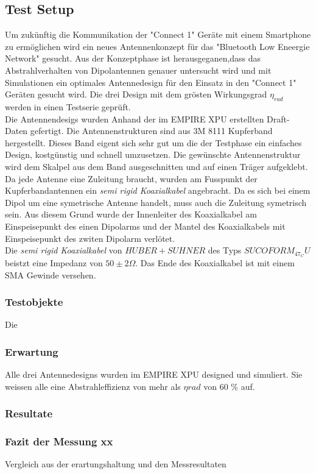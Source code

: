 \subsection{Test Setup}
Um zukünftig die Kommunikation der "Connect 1" Geräte mit einem Smartphone zu ermöglichen wird ein neues Antennenkonzept für das "Bluetooth Low Eneergie Network" gesucht. Aus der Konzeptphase ist herausgeganen,dass das Abstrahlverhalten von Dipolantennen genauer untersucht wird und mit Simulationen ein optimales Antennedesign für den Einsatz in den "Connect 1" Geräten gesucht wird. Die drei Design mit dem grösten Wirkungsgrad $\eta_{rad}$ werden in einen Testserie geprüft.\\
Die Antennendesigs wurden Anhand der im EMPIRE XPU erstellten Draft-Daten gefertigt. Die Antennenstrukturen sind aus 3M 8111 Kupferband hergestellt. Dieses Band eigent sich sehr gut um die der Testphase ein einfaches Design, kostgünstig und schnell umzusetzen. Die gewünschte Antennenstruktur wird dem Skalpel aus dem Band ausgeschnitten und auf einen Träger aufgeklebt. \\
Da jede Antenne eine Zuleitung braucht, wurden am Fusspunkt der Kupferbandantennen ein \textit{semi rigid Koaxialkabel} angebracht. Da es sich bei einem Dipol um eine symetrische Antenne handelt, muss auch die Zuleitung symetrisch sein. Aus diesem Grund wurde der Innenleiter des Koaxialkabel am Einspeisepunkt des einen Dipolarms und der Mantel des Koaxialkabels mit Einspeisepunkt des zwiten Dipolarm verlötet.\\
Die \textit{semi rigid Koaxialkabel} von $HUBER+SUHNER$ des Typs $SUCOFORM_47_CU$ beistzt eine Impedanz von $50  \pm 2\Omega$. Das Ende des Koaxialkabel ist mit einem SMA Gewinde versehen.\\

\subsubsection{Testobjekte}
Die 
\subsubsection{Erwartung}
Alle drei Antennedesigns wurden im EMPIRE XPU designed und simuliert. Sie weissen alle eine Abstrahleffizienz von mehr als $\eta{rad}$ von 60 $\%$ auf. 
\subsubsection{Resultate}
\subsubsection{Fazit der Messung xx}
Vergleich aus der erartungshaltung und den Messresultaten